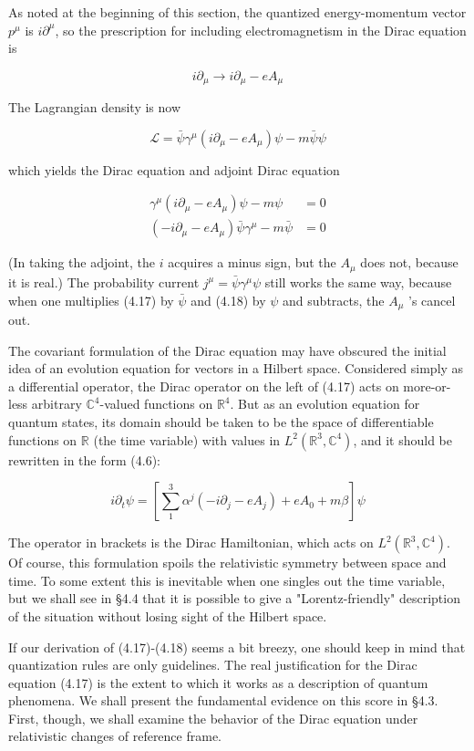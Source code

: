 \documentclass[10pt, letterpaper]{article}
\begin{document}
As noted at the beginning of this section, the quantized energy-momentum vector $p^{\mu}$ is $i \partial^{\mu}$, so the prescription for including electromagnetism in the Dirac equation is

$$
i \partial_{\mu} \rightarrow i \partial_{\mu}-e A_{\mu}
$$

The Lagrangian density is now

$$
\mathcal{L}=\bar{\psi} \gamma^{\mu}\left(i \partial_{\mu}-e A_{\mu}\right) \psi-m \bar{\psi} \psi
$$

which yields the Dirac equation and adjoint Dirac equation

$$
\begin{aligned}
\gamma^{\mu}\left(i \partial_{\mu}-e A_{\mu}\right) \psi-m \psi & =0 \\
\left(-i \partial_{\mu}-e A_{\mu}\right) \bar{\psi} \gamma^{\mu}-m \bar{\psi} & =0
\end{aligned}
$$

(In taking the adjoint, the $i$ acquires a minus sign, but the $A_{\mu}$ does not, because it is real.) The probability current $j^{\mu}=\bar{\psi} \gamma^{\mu} \psi$ still works the same way, because when one multiplies (4.17) by $\bar{\psi}$ and (4.18) by $\psi$ and subtracts, the $A_{\mu}$ 's cancel out.

The covariant formulation of the Dirac equation may have obscured the initial idea of an evolution equation for vectors in a Hilbert space. Considered simply as a differential operator, the Dirac operator on the left of (4.17) acts on more-or-less arbitrary $\mathbb{C}^{4}$-valued functions on $\mathbb{R}^{4}$. But as an evolution equation for quantum states, its domain should be taken to be the space of differentiable functions on $\mathbb{R}$ (the time variable) with values in $L^{2}\left(\mathbb{R}^{3}, \mathbb{C}^{4}\right)$, and it should be rewritten in the form (4.6):

$$
i \partial_{t} \psi=\left[\sum_{1}^{3} \alpha^{j}\left(-i \partial_{j}-e A_{j}\right)+e A_{0}+m \beta\right] \psi
$$

The operator in brackets is the Dirac Hamiltonian, which acts on $L^{2}\left(\mathbb{R}^{3}, \mathbb{C}^{4}\right)$. Of course, this formulation spoils the relativistic symmetry between space and time. To some extent this is inevitable when one singles out the time variable, but we shall see in §4.4 that it is possible to give a "Lorentz-friendly" description of the situation without losing sight of the Hilbert space.

If our derivation of (4.17)-(4.18) seems a bit breezy, one should keep in mind that quantization rules are only guidelines. The real justification for the Dirac equation (4.17) is the extent to which it works as a description of quantum phenomena. We shall present the fundamental evidence on this score in §4.3. First, though, we shall examine the behavior of the Dirac equation under relativistic changes of reference frame.
\end{document}
